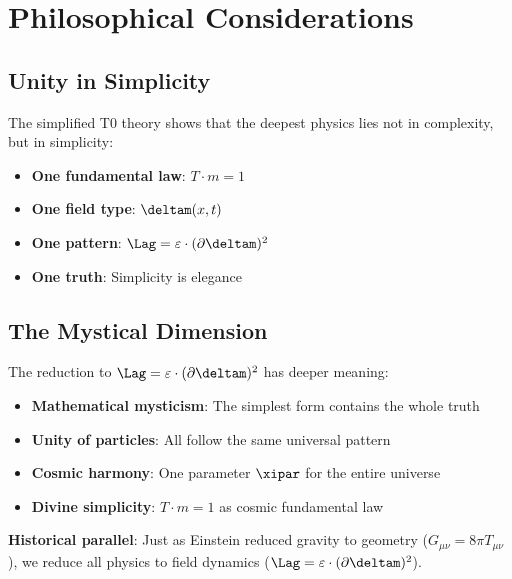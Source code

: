 	\section{Philosophical Considerations}
	
	\subsection{Unity in Simplicity}
	
	\begin{tcolorbox}[colback=green!5!white,colframe=green!75!black,title=Philosophical Insight]
		The simplified T0 theory shows that the deepest physics lies not in complexity, but in simplicity:
		
		\begin{itemize}
			\item \textbf{One fundamental law}: $T \cdot m = 1$
			\item \textbf{One field type}: $\deltam(x,t)$
			\item \textbf{One pattern}: $\Lag = \varepsilon \cdot (\partial \deltam)^2$
			\item \textbf{One truth}: Simplicity is elegance
		\end{itemize}
	\end{tcolorbox}
	
	\subsection{The Mystical Dimension}
	
	The reduction to $\Lag = \varepsilon \cdot (\partial \deltam)^2$ has deeper meaning:
	
	\begin{itemize}
		\item \textbf{Mathematical mysticism}: The simplest form contains the whole truth
		\item \textbf{Unity of particles}: All follow the same universal pattern
		\item \textbf{Cosmic harmony}: One parameter $\xipar$ for the entire universe
		\item \textbf{Divine simplicity}: $T \cdot m = 1$ as cosmic fundamental law
	\end{itemize}
	
	\textbf{Historical parallel}: Just as Einstein reduced gravity to geometry ($G_{\mu\nu} = 8\pi T_{\mu\nu}$), we reduce all physics to field dynamics ($\Lag = \varepsilon \cdot (\partial \deltam)^2$).
	
